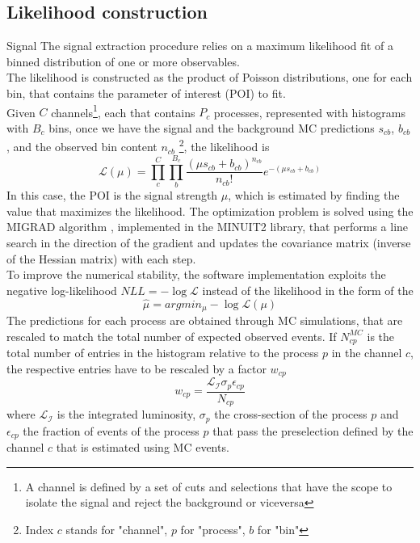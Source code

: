 \subsection{Likelihood construction}Signal
The signal extraction procedure relies on a maximum likelihood fit of a binned distribution of one or more observables.\\
The likelihood is constructed as the product of Poisson distributions, one for each bin, that contains the parameter of interest (POI) to fit.\\
Given $C$ channels\footnote{A channel is defined by a set of cuts and selections that have the scope to isolate the signal and reject the background or viceversa}, each that contains $P_c$ processes, represented with histograms with $B_c$ bins, once we have the signal and the background MC predictions $s_{cb}$, $b_{cb}$, and the observed bin content $n_{cb}$ \footnote{Index $c$ stands for "channel", $p$ for "process", $b$ for "bin"}, the likelihood is \cite{Khachatryan2015PreciseTeV}
\begin{equation}
    \mathcal{L}(\mu)=\prod_c^C \prod_b^{B_c} \frac{(\mu s_{cb}+b_{cb})^{n_{cb}}}{n_{cb}!} e^{-(\mu s_{cb}+b_{cb})}
\end{equation}
In this case, the POI is the signal strength $\mu$, which is estimated by finding the value that maximizes the likelihood. The optimization problem is solved using the \textsc{MIGRAD} algorithm \cite{James1998MINUIT:Manual}, implemented in the \textsc{MINUIT2} library, that performs a line search in the direction of the gradient and updates the covariance matrix (inverse of the Hessian matrix) with each step.\\
To improve the numerical stability, the software implementation exploits the negative log-likelihood $\textit{NLL}=-\log{\mathcal{L}}$ instead of the likelihood in the form of the   
\begin{equation*}
    \hat{\mu}=argmin_\mu - \log{\mathcal{L}(\mu)}
\end{equation*}
The predictions for each process are obtained through MC simulations, that are rescaled to match the total number of expected observed events. If $N^{MC}_{cp}$ is the total number of entries in the histogram relative to the process $p$ in the channel $c$, the respective entries have to be rescaled by a factor $w_{cp}$
\begin{equation}
    w_{cp}=\frac{\mathcal{L_I} \sigma_p \epsilon_{cp}}{N_{cp}}
\end{equation}
where $\mathcal{L_I}$ is the integrated luminosity, $\sigma_p$ the cross-section of the process $p$ and $\epsilon_{cp}$ the fraction of events of the process $p$ that pass the preselection defined by the channel $c$ that is estimated using MC events. 
\\
\newpage
